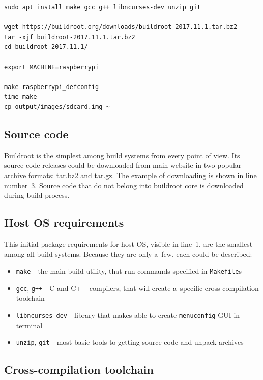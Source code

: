 \documentclass[printmode]{mgr}
\begin{document}

\begin{lstlisting}
sudo apt install make gcc g++ libncurses-dev unzip git 

wget https://buildroot.org/downloads/buildroot-2017.11.1.tar.bz2
tar -xjf buildroot-2017.11.1.tar.bz2
cd buildroot-2017.11.1/

export MACHINE=raspberrypi

make raspberrypi_defconfig
time make
cp output/images/sdcard.img ~
\end{lstlisting}



\subsection*{Source code}

Buildroot is the simplest among build systems from every point of view.
Its source code releases could be downloaded from main website in two popular archive formats: tar.bz2 and tar.gz.
The example of downloading is shown in line number~3.
Source code that do not belong into buildroot core is downloaded during build process.

\subsection*{Host OS requirements}

This initial package requirements for host OS, visible in line~1, are the smallest among all build systems. Because they are only a~few, each could be described:

\begin{itemize}
    \itemsep0em
    \item \verb|make| - the main build utility, that run commands specified in \verb|Makefile|s
    \item \verb|gcc|, \verb|g++| - C and C++ compilers, that will create a~specific cross-compilation toolchain
    \item \verb|libncurses-dev| - library that makes able to create \verb|menuconfig| GUI in terminal
    \item \verb|unzip|, \verb|git| - most basic tools to getting source code and unpack archives
\end{itemize}

\subsection*{Cross-compilation toolchain}
\end{document}
